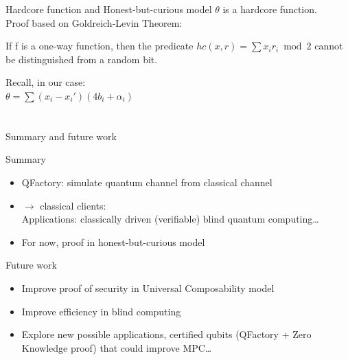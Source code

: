 \documentclass[]{beamer}
\begin{document}
\begin{frame}[t]{Hardcore function and Honest-but-curious model}
$\theta$ is a hardcore function. \\
Proof based on Goldreich-Levin Theorem:
\begin{theorem}
If f is a one-way function, then the predicate $hc(x, r) = \sum x_i r_i \bmod 2$ cannot be distinguished from a random bit. 
\end{theorem}

Recall, in our case: \\
$ \theta = \sum (x_i - x_i') (4b_i + \alpha_i) $


\end{frame}




\section{}
\begin{frame}{Summary and future work}
  \begin{block}{Summary}
    \begin{itemize}
    \item QFactory: simulate quantum channel from classical channel
    \item {} $\rightarrow$ classical clients:\\Applications: classically driven (verifiable) blind quantum computing\dots
    \item For now, proof in honest-but-curious model
    \end{itemize}
  \end{block}
  \begin{exampleblock}{Future work}
    \begin{itemize}
    \item Improve proof of security in Universal Composability model
    \item Improve efficiency in blind computing
    \item Explore new possible applications, certified qubits (QFactory + Zero Knowledge proof) that could improve MPC\dots
    \end{itemize}
  \end{exampleblock}
\end{frame}
\end{document}
